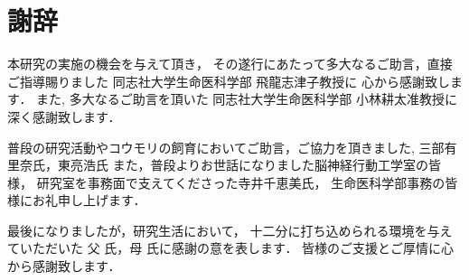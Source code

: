 \documentclass[../main]{subfiles}
\begin{document}
\chapter*{謝辞}

本研究の実施の機会を与えて頂き，
その遂行にあたって多大なるご助言，直接ご指導賜りました
同志社大学生命医科学部 飛龍志津子教授に
心から感謝致します．
また, 多大なるご助言を頂いた
同志社大学生命医科学部 小林耕太准教授に深く感謝致します．

普段の研究活動やコウモリの飼育においてご助言，ご協力を頂きました,
三部有里奈氏，東亮浩氏
また，普段よりお世話になりました脳神経行動工学室の皆様，
研究室を事務面で支えてくださった寺井千恵美氏，
生命医科学部事務の皆様にお礼申し上げます．

最後になりましたが，研究生活において，
十二分に打ち込められる環境を与えていただいた
父 氏，母 氏に感謝の意を表します．
皆様のご支援とご厚情に心から感謝致します．
\end{document}
